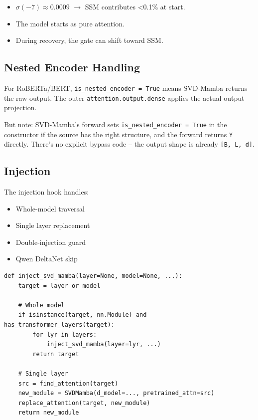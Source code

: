 \begin{itemize}
\item $\sigma(-7) \approx 0.0009$ $\to$ SSM contributes <0.1\% at start.
\item The model starts as pure attention.
\item During recovery, the gate can shift toward SSM.

\end{itemize}
\subsection{Nested Encoder Handling}

For RoBERTa/BERT, \texttt{is\_nested\_encoder = True} means SVD-Mamba returns the 
raw output. The outer \texttt{attention.output.dense} applies the actual output 
projection.

But note: SVD-Mamba's forward sets \texttt{is\_nested\_encoder = True} in the 
constructor if the source has the right structure, and the forward 
returns \texttt{Y} directly. There's no explicit bypass code -- the output 
shape is already \texttt{[B, L, d]}.

\subsection{Injection}

The injection hook handles:

\begin{itemize}
\item Whole-model traversal
\item Single layer replacement
\item Double-injection guard
\item Qwen DeltaNet skip

\end{itemize}
\begin{lstlisting}
def inject_svd_mamba(layer=None, model=None, ...):
    target = layer or model
    
    # Whole model
    if isinstance(target, nn.Module) and has_transformer_layers(target):
        for lyr in layers:
            inject_svd_mamba(layer=lyr, ...)
        return target
    
    # Single layer
    src = find_attention(target)
    new_module = SVDMamba(d_model=..., pretrained_attn=src)
    replace_attention(target, new_module)
    return new_module
\end{lstlisting}

